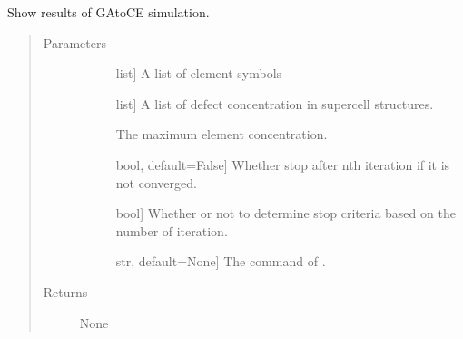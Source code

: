 \documentclass[letterpaper,10pt,english]{sphinxmanual}
\begin{document}
\begin{fulllineitems}
\label{\detokenize{pygace.scripts:pygace.scripts.rungace.show_results}}
\sphinxAtStartPar
Show results of GA\sphinxhyphen{}to\sphinxhyphen{}CE simulation.
\begin{quote}\begin{description}
\item[{Parameters}] \leavevmode\begin{description}
\item[{}] \leavevmode{[}list{]}
\sphinxAtStartPar
A list of element symbols

\item[{}] \leavevmode{[}list{]}
\sphinxAtStartPar
A list of defect concentration in supercell structures.

\item[{}] \leavevmode
\sphinxAtStartPar
The maximum element concentration.

\item[{}] \leavevmode{[}bool, default=False{]}
\sphinxAtStartPar
Whether stop after {\color{red}\bfseries{}\textasciigrave{}}n\textasciigrave{}th iteration if it is not converged.

\item[{}] \leavevmode{[}bool{]}
\sphinxAtStartPar
Whether or not to determine stop criteria based on the number of iteration.

\item[{}] \leavevmode{[}str, default=None{]}
\sphinxAtStartPar
The command of .

\end{description}

\item[{Returns}] \leavevmode\begin{description}
\item[{None}] \leavevmode
\end{description}

\end{description}\end{quote}

\end{fulllineitems}
\end{document}
